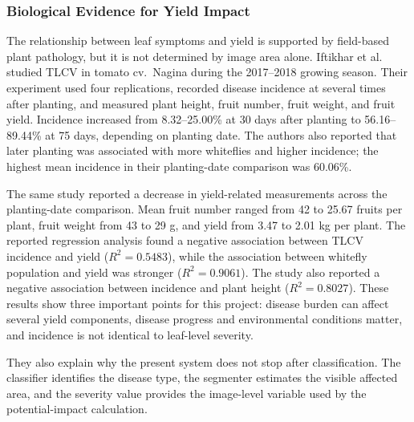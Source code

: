 \documentclass[12pt,a4paper]{article}
\begin{document}
\subsubsection{Biological Evidence for Yield Impact}
The relationship between leaf symptoms and yield is supported by field-based plant
pathology, but it is not determined by image area alone. Iftikhar et al.~\cite{iftikhar2021tlcv}
studied TLCV in tomato cv.~Nagina during the 2017--2018 growing season. Their experiment
used four replications, recorded disease incidence at several times after planting, and
measured plant height, fruit number, fruit weight, and fruit yield. Incidence increased
from 8.32--25.00\% at 30 days after planting to 56.16--89.44\% at 75 days, depending on
planting date. The authors also reported that later planting was associated with more
whiteflies and higher incidence; the highest mean incidence in their planting-date
comparison was 60.06\%.

The same study reported a decrease in yield-related measurements across the planting-date
comparison. Mean fruit number ranged from 42 to 25.67 fruits per plant, fruit weight from
43 to 29 g, and yield from 3.47 to 2.01 kg per plant. The reported regression analysis
found a negative association between TLCV incidence and yield ($R^2=0.5483$), while the
association between whitefly population and yield was stronger ($R^2=0.9061$). The study
also reported a negative association between incidence and plant height
($R^2=0.8027$). These results show three important points for this project: disease
burden can affect several yield components, disease progress and environmental conditions
matter, and incidence is not identical to leaf-level severity.

They also explain why the present system does not stop after classification. The classifier
identifies the disease type, the segmenter estimates the visible affected area, and the
severity value provides the image-level variable used by the potential-impact calculation.
\end{document}

